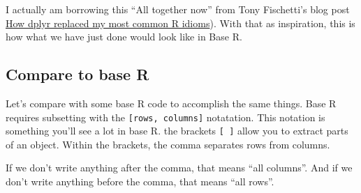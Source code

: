 \documentclass[]{book}
\newenvironment{Shaded}{\begin{snugshade}}{\end{snugshade}}
\newcommand{\KeywordTok}[1]{\textcolor[rgb]{0.13,0.29,0.53}{\textbf{{#1}}}}
\newcommand{\DataTypeTok}[1]{\textcolor[rgb]{0.13,0.29,0.53}{{#1}}}
\newcommand{\StringTok}[1]{\textcolor[rgb]{0.31,0.60,0.02}{{#1}}}
\newcommand{\CommentTok}[1]{\textcolor[rgb]{0.56,0.35,0.01}{\textit{{#1}}}}
\newcommand{\NormalTok}[1]{{#1}}
\theoremstyle{definition}
\theoremstyle{definition}
\theoremstyle{definition}
\theoremstyle{remark}
\begin{document}
\begin{Shaded}
\end{Shaded}

I actually am borrowing this ``All together now'' from Tony Fischetti's
blog post
\href{http://www.statsblogs.com/2014/02/10/how-dplyr-replaced-my-most-common-r-idioms/}{How
dplyr replaced my most common R idioms}). With that as inspiration, this
is how what we have just done would look like in Base R.

\subsection{Compare to base R}\label{compare-to-base-r}

Let's compare with some base R code to accomplish the same things. Base
R requires subsetting with the \texttt{{[}rows,\ columns{]}} notatation.
This notation is something you'll see a lot in base R. the brackets
\texttt{{[}\ {]}} allow you to extract parts of an object. Within the
brackets, the comma separates rows from columns.

If we don't write anything after the comma, that means ``all columns''.
And if we don't write anything before the comma, that means ``all
rows''.
\end{document}
